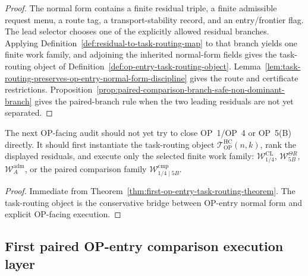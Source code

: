\begin{proof}
The normal form contains a finite residual triple, a finite admissible request menu, a route tag, a transport-stability record, and an entry/frontier flag.  The lead selector chooses one of the explicitly allowed residual branches.  Applying Definition~\ref{def:residual-to-task-routing-map} to that branch yields one finite work family, and adjoining the inherited normal-form fields gives the task-routing object of Definition~\ref{def:op-entry-task-routing-object}.  Lemma~\ref{lem:task-routing-preserves-op-entry-normal-form-discipline} gives the route and certificate restrictions.  Proposition~\ref{prop:paired-comparison-branch-safe-non-dominant-branch} gives the paired-branch rule when the two leading residuals are not yet separated.
\end{proof}

\begin{corollary}
\label{cor:v3340-r03-working-rule}
The next OP-facing audit should not yet try to close OP~1/OP~4 or OP~5(B) directly.  It should first instantiate the task-routing object $\mathcal T_{\mathrm{OP}}^{\mathrm{HC}}(n,k)$, rank the displayed residuals, and execute only the selected finite work family: $\mathcal W_{1/4}^{\mathrm{CL}}$, $\mathcal W_{5B}^{\Theta R}$, $\mathcal W_A^{\mathrm{adm}}$, or the paired comparison family $\mathcal W_{1/4\mid 5B}^{\mathrm{cmp}}$.
\end{corollary}

\begin{proof}
Immediate from Theorem~\ref{thm:first-op-entry-task-routing-theorem}.  The task-routing object is the conservative bridge between OP-entry normal form and explicit OP-facing execution.
\end{proof}


\subsection{First paired OP-entry comparison execution layer}
\label{subsec:first-paired-op-entry-comparison-execution-layer}

